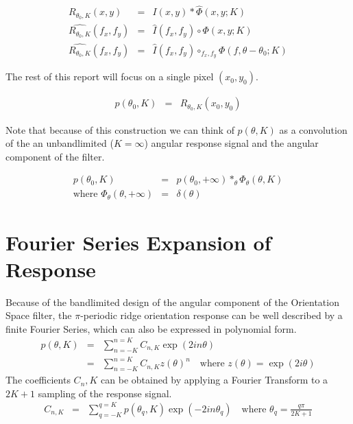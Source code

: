 \documentclass{article}
\begin{document}
\begin{eqnarray}
    R_{\theta_0,K}(x,y) & = & I(x,y) \ast \hat{\Phi}(x,y; K) \\
    \widehat{R_{\theta_0,K}}(f_x,f_y) & = & \hat{I}(f_x,f_y) \circ \Phi(x,y; K) \\
    \widehat{R_{\theta_0,K}}(f_x,f_y) & = & \hat{I}(f_x,f_y) \circ_{f_x,f_y} \Phi(f,\theta-\theta_0; K)
\end{eqnarray}

The rest of this report will focus on a single pixel $ (x_0,y_0) $.

\begin{eqnarray}
    p(\theta_0,K) & = & R_{\theta_0,K}(x_0,y_0)
\end{eqnarray}

Note that because of this construction we can think of $ p(\theta,K) $ as a convolution of the an unbandlimited ($K = \infty $) angular response signal and the angular component of the filter.

\begin{eqnarray}
    p(\theta_0,K) & = & p(\theta_0,+\infty) \ast_\theta \Phi_\theta(\theta,K) \\
    \mbox{where } \Phi_\theta(\theta,+\infty) & = & \delta({\theta})
\end{eqnarray}



\section{Fourier Series Expansion of Response}
Because of the bandlimited design of the angular component of the Orientation Space filter, the $\pi$-periodic ridge orientation response can be well described by a finite Fourier Series, which can also be expressed in polynomial form.
\begin{eqnarray}
    p(\theta,K) & = & \sum_{n=-K}^{n=K} C_{n,K} \exp(2 i n \theta) \\
    & = & \sum_{n=-K}^{n=K} C_{n,K} z(\theta)^n \quad \mbox{where } z(\theta) = \exp(2 i \theta)
\end{eqnarray}
The coefficients $ C_n,K $ can be obtained by applying a Fourier Transform to a $ 2K+1 $ sampling of the response signal.
\begin{eqnarray}
    C_{n,K} & = & \sum_{q=-K}^{q=K} p(\theta_q,K) \exp(-2 i n \theta_q) \quad \mbox{where } \theta_q = \frac{q \pi}{2K+1}  
\end{eqnarray}
\end{document}
